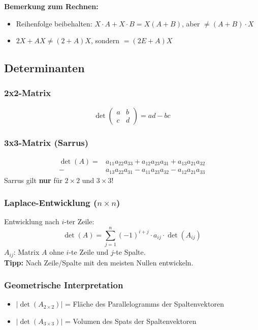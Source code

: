 \textbf{Bemerkung zum Rechnen:}
\begin{itemize}
    \item Reihenfolge beibehalten: $X \cdot A + X \cdot B = X(A+B)$, aber $\neq (A+B) \cdot X$
    \item $2X + AX \neq (2+A)X$, sondern $= (2E + A)X$
\end{itemize}

\subsection{Determinanten}

\subsubsection{2x2-Matrix}
\[
    \det\begin{pmatrix} a & b \\ c & d \end{pmatrix} = ad - bc
\]

\subsubsection{3x3-Matrix (Sarrus)}
\begin{align*}
    \det(A) = &a_{11}a_{22}a_{33} + a_{12}a_{23}a_{31} + a_{13}a_{21}a_{32}\\ 
        - &a_{13}a_{22}a_{31} - a_{11}a_{23}a_{32} - a_{12}a_{21}a_{33}
\end{align*}
Sarrus gilt \textbf{nur} für $2 \times 2$ und $3 \times 3$!

\subsubsection{Laplace-Entwicklung (\(n \times n\))}
Entwicklung nach $i$-ter Zeile:
\[
    \det(A) = \sum_{j=1}^{n} (-1)^{i+j} \cdot a_{ij} \cdot \det(A_{ij})
\]
$A_{ij}$: Matrix $A$ ohne $i$-te Zeile und $j$-te Spalte. \\
\textbf{Tipp:} Nach Zeile/Spalte mit den meisten Nullen entwickeln.

\subsubsection{Geometrische Interpretation}
\begin{itemize}
    \item $|\det(A_{2\times2})|$ = Fläche des Parallelogramms der Spaltenvektoren
    \item $|\det(A_{3\times3})|$ = Volumen des Spats der Spaltenvektoren
\end{itemize}

